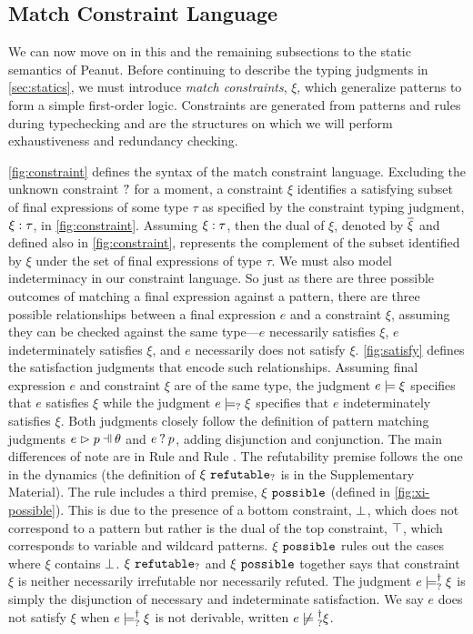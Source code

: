 \subsection{Match Constraint Language}\label{sec:constraint}
We can now move on in this and the remaining subsections to the static semantics of Peanut. Before continuing to describe the typing judgments in \autoref{sec:statics}, we must introduce \emph{match constraints}, $\xi$,
which generalize patterns to form a simple first-order logic. Constraints are generated from patterns and rules during typechecking and are the structures on which we will perform exhaustiveness and redundancy checking. 





\autoref{fig:constraint} defines the syntax of the match constraint language. 
Excluding the unknown constraint $\mathtt{?}$ for a moment, a constraint $\xi$ identifies a satisfying subset of final expressions of some type $\tau$ as specified by the constraint typing judgment,  $\xi : \tau$, in \autoref{fig:constraint}.
Assuming $\xi : \tau$, then the dual of $\xi$, denoted by $\overline{\xi}$ and defined also in \autoref{fig:constraint}, represents the complement of the subset identified by $\xi$ under the set of final expressions of type $\tau$.
We must also model indeterminacy in our constraint language. So just as there are three possible outcomes of matching a final expression against a pattern, there are three possible relationships between a final expression $e$ and a constraint $\xi$, assuming they can be checked against the same type---$e$ necessarily satisfies $\xi$, $e$ indeterminately satisfies $\xi$, and $e$ necessarily does not satisfy $\xi$. 
%
\autoref{fig:satisfy} defines the satisfaction judgments that encode such relationships. Assuming
final expression $e$ and constraint $\xi$ are of the same type, the
judgment $e \models \xi$ specifies that $e$ satisfies $\xi$ while
the judgment $e \models_{?} \xi$ specifies that $e$ indeterminately satisfies $\xi$. Both judgments closely follow the definition of pattern matching judgments $\hpatmatch{e}{p}{\theta}$ and $e \mathbin{?} p$, adding disjunction and conjunction. The main differences of note are in Rule \CSNotIntroPair and Rule \CMSNotIntro. The refutability premise follows the one in the dynamics (the definition of $\xi ~\mathtt{refutable}_?$ is in the Supplementary Material). The \CMSNotIntro rule includes a third premise, $\xi ~\mathtt{possible}$ (defined in \autoref{fig:xi-possible}). This is due to the presence of a bottom constraint, $\bot$, which does not correspond to a pattern but rather is the dual of the top constraint, $\top$, which corresponds to variable and wildcard patterns. 
$\xi ~\mathtt{possible}$ rules out the cases where $\xi$ contains $\bot$. $\xi ~\mathtt{refutable}_?$ and $\xi ~\mathtt{possible}$ together says that constraint $\xi$ is neither necessarily irrefutable nor necessarily refuted.
The judgment $e \models_{?}^{\dag} \xi$ is simply the disjunction of necessary and indeterminate satisfaction. 
We say $e$ does not satisfy $\xi$ when $e \models_{?}^{\dag} \xi$ is not derivable, written $\cnotsatisfyormay{e}{\xi}$.

